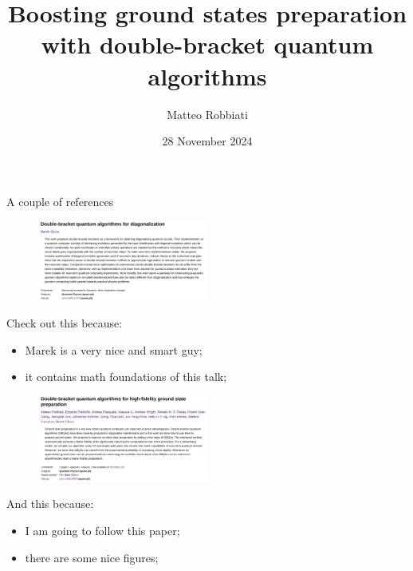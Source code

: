 \documentclass[aspectratio=169, 8pt, xcolor={svgnames}, hyperref={linkcolor=black}]{beamer}
\title{Boosting ground states preparation with double-bracket quantum algorithms}
\date{28 November 2024}
\author{Matteo Robbiati}
\begin{document}
\begin{frame}
\maketitle
\end{frame}

\begin{frame}{A couple of references}
\begin{multicols}{2}
\begin{figure}
   \includegraphics[width=0.5\textwidth]{figures/dbqa_paper.png}
\end{figure}
Check out this because:
\begin{itemize}[noitemsep]
\item[1.] Marek is a very nice and smart guy;
\item[2.] it contains math foundations of this talk; 
\end{itemize}
\begin{figure}
   \includegraphics[width=0.5\textwidth]{figures/boostvqe_paper.png}
\end{figure}
And this because:
\begin{itemize}[noitemsep]
\item[1.] I am going to follow this paper;
\item[2.] there are some nice figures; 
\end{itemize}
\end{multicols}
\end{frame}
\end{document}
